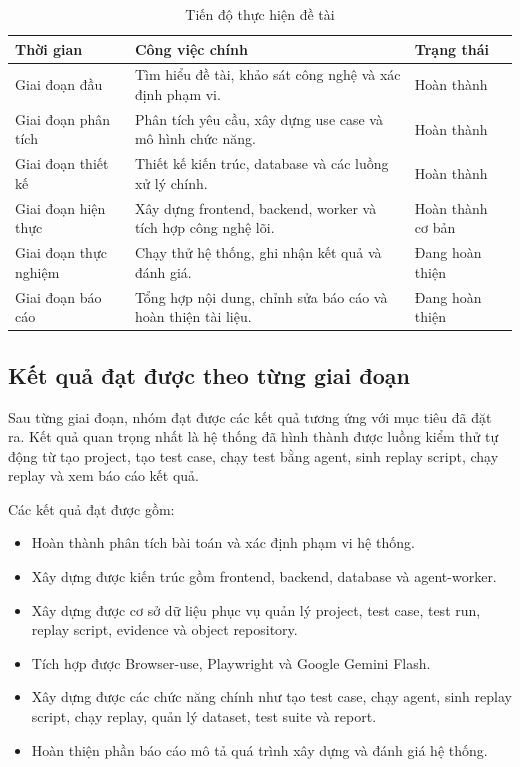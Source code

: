 \begin{table}[H]
\centering
\caption{Tiến độ thực hiện đề tài}
\label{tab:chapter7_timeline}
\renewcommand{\arraystretch}{1.2}
\begin{tabular}{|p{3.0cm}|p{8.2cm}|p{3.0cm}|}
\hline
\textbf{Thời gian} & \textbf{Công việc chính} & \textbf{Trạng thái} \\
\hline
Giai đoạn đầu & Tìm hiểu đề tài, khảo sát công nghệ và xác định phạm vi. & Hoàn thành \\
\hline
Giai đoạn phân tích & Phân tích yêu cầu, xây dựng use case và mô hình chức năng. & Hoàn thành \\
\hline
Giai đoạn thiết kế & Thiết kế kiến trúc, database và các luồng xử lý chính. & Hoàn thành \\
\hline
Giai đoạn hiện thực & Xây dựng frontend, backend, worker và tích hợp công nghệ lõi. & Hoàn thành cơ bản \\
\hline
Giai đoạn thực nghiệm & Chạy thử hệ thống, ghi nhận kết quả và đánh giá. & Đang hoàn thiện \\
\hline
Giai đoạn báo cáo & Tổng hợp nội dung, chỉnh sửa báo cáo và hoàn thiện tài liệu. & Đang hoàn thiện \\
\hline
\end{tabular}
\end{table}

\subsection{Kết quả đạt được theo từng giai đoạn}

Sau từng giai đoạn, nhóm đạt được các kết quả tương ứng với mục tiêu đã đặt ra. Kết quả quan trọng nhất là hệ thống đã hình thành được luồng kiểm thử tự động từ tạo project, tạo test case, chạy test bằng agent, sinh replay script, chạy replay và xem báo cáo kết quả.

Các kết quả đạt được gồm:

\begin{itemize}
    \item Hoàn thành phân tích bài toán và xác định phạm vi hệ thống.
    \item Xây dựng được kiến trúc gồm frontend, backend, database và agent-worker.
    \item Xây dựng được cơ sở dữ liệu phục vụ quản lý project, test case, test run, replay script, evidence và object repository.
    \item Tích hợp được Browser-use, Playwright và Google Gemini Flash.
    \item Xây dựng được các chức năng chính như tạo test case, chạy agent, sinh replay script, chạy replay, quản lý dataset, test suite và report.
    \item Hoàn thiện phần báo cáo mô tả quá trình xây dựng và đánh giá hệ thống.
\end{itemize}

